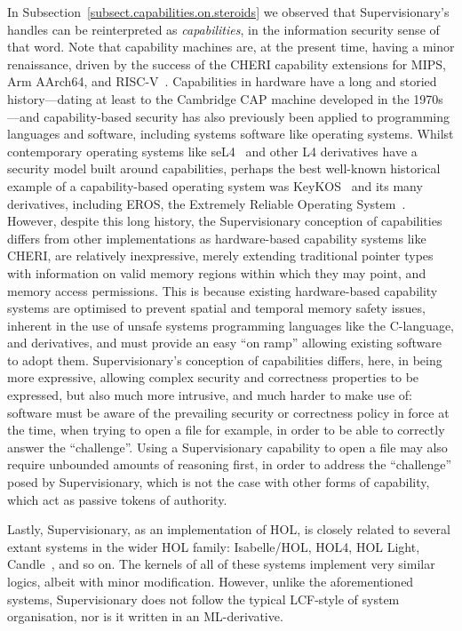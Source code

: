 \documentclass[a4paper, UKenglish, cleveref, autoref, thm-restate, colorlinks]{lipics-v2021}
\begin{document}
In Subsection~\ref{subsect.capabilities.on.steroids} we observed that Supervisionary's handles can be reinterpreted as \emph{capabilities}, in the information security sense of that word.
Note that capability machines are, at the present time, having a minor renaissance, driven by the success of the CHERI capability extensions for MIPS, Arm AArch64, and RISC-V~\cite{DBLP:conf/sp/NienhuisJBFR0NN20}.
Capabilities in hardware have a long and storied history---dating at least to the Cambridge CAP machine developed in the 1970s---and capability-based security has also previously been applied to programming languages and software, including systems software like operating systems.
Whilst contemporary operating systems like seL4~\cite{DBLP:conf/sosp/KleinEHACDEEKNSTW09} and other L4 derivatives have a security model built around capabilities, perhaps the best well-known historical example of a capability-based operating system was KeyKOS~\cite{DBLP:conf/sp/RajunasHBFL86, DBLP:journals/sigops/Hardy85} and its many derivatives, including EROS, the Extremely Reliable Operating System~\cite{DBLP:journals/software/ShapiroH02}.
However, despite this long history, the Supervisionary conception of capabilities differs from other implementations as hardware-based capability systems like CHERI, are relatively inexpressive, merely extending traditional pointer types with information on valid memory regions within which they may point, and memory access permissions.
This is because existing hardware-based capability systems are optimised to prevent spatial and temporal memory safety issues, inherent in the use of unsafe systems programming languages like the C-language, and derivatives, and must provide an easy ``on ramp'' allowing existing software to adopt them.
Supervisionary's conception of capabilities differs, here, in being more expressive, allowing complex security and correctness properties to be expressed, but also much more intrusive, and much harder to make use of: software must be aware of the prevailing security or correctness policy in force at the time, when trying to open a file for example, in order to be able to correctly answer the ``challenge''.
Using a Supervisionary capability to open a file may also require unbounded amounts of reasoning first, in order to address the ``challenge'' posed by Supervisionary, which is not the case with other forms of capability, which act as passive tokens of authority.

Lastly, Supervisionary, as an implementation of HOL, is closely related to several extant systems in the wider HOL family: Isabelle/HOL, HOL4, HOL Light, Candle~\cite{DBLP:conf/itp/AbrahamssonMKS22}, and so on.
The kernels of all of these systems implement very similar logics, albeit with minor modification.
However, unlike the aforementioned systems, Supervisionary does not follow the typical LCF-style of system organisation, nor is it written in an ML-derivative.
\end{document}

